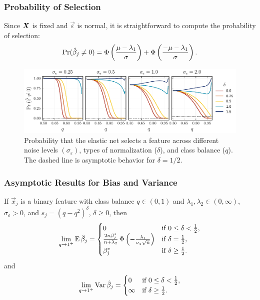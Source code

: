 \documentclass[10pt]{beamer}
\begin{document}
\begin{frame}[c]
  \frametitle{Probability of Selection}

  Since \(\boldsymbol{X}\) is fixed and \(\vec{\varepsilon}\) is normal, it is straightforward to compute the probability of selection:
  \[
    \Pr(\hat{\beta}_j \neq 0) = \operatorname{\Phi}\left(\frac{\mu - \lambda_1}{\sigma}\right) + \operatorname{\Phi}\left(\frac{- \mu -\lambda_1}{\sigma}\right).
  \]

  \begin{figure}[htpb]
    \centering
    \includegraphics[width=\textwidth]{figures/selection_probability.pdf}
    \caption{%
      Probability that the elastic net selects a feature across different noise levels \((\sigma_\varepsilon)\), types of normalization (\(\delta\)), and class balance (\(q\)).
      The dashed line is asymptotic behavior for \(\delta = 1/2\).
    }
  \end{figure}
\end{frame}

\begin{frame}[c]
  \frametitle{Asymptotic Results for Bias and Variance}

  \begin{theorem}
    If \(\vec{x}_j\) is a binary feature with class balance \(q \in (0, 1)\) and \(\lambda_1,\lambda_2 \in (0,\infty)\), \(\sigma_\varepsilon > 0\), and \(s_j = (q - q^2)^{\delta}\), \(\delta \geq 0\), then
    \[
      \lim_{q \rightarrow 1^+} \operatorname{E} \hat{\beta}_j =
      \begin{cases}
        0                                                                                                  & \text{if } 0 \leq \delta < \frac{1}{2}, \\
        \frac{2n \beta_j^*}{n + \lambda_2} \operatorname{\Phi}\left(-\frac{\lambda_1}{\sigma_\varepsilon \sqrt{n}}\right) & \text{if } \delta = \frac{1}{2},        \\
        \beta^*_j                                                                                          & \text{if } \delta \geq \frac{1}{2}.
      \end{cases}
    \]
    \pause and
    \[
      \lim_{q \rightarrow 1^+} \operatorname{Var} \hat{\beta}_j =
      \begin{cases}
        0      & \text{if } 0 \leq \delta < \frac{1}{2}, \\
        \infty & \text{if } \delta \geq \frac{1}{2}.
      \end{cases}
    \]
  \end{theorem}

\end{frame}
\end{document}
